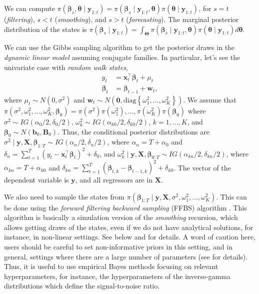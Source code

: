 We can compute $\pi(\bm{\beta}_s,\bm{\theta}\mid \bm{y}_{1:t})=\pi(\bm{\beta}_s\mid \bm{y}_{1:t},\bm{\theta})\pi(\bm{\theta}\mid \bm{y}_{1:t})$, for $s=t$ (\textit{filtering}), $s<t$ (\textit{smoothing}), and $s>t$ (\textit{forecasting}). The marginal posterior distribution of the states is $\pi(\bm{\beta}_s\mid \bm{y}_{1:t})=\int_{\bm{\Theta}}\pi(\bm{\beta}_s\mid \bm{y}_{1:t},\bm{\theta})\pi(\bm{\theta}\mid \bm{y}_{1:t})d\bm{\theta}$.

We can use the Gibbs sampling algorithm to get the posterior draws in the \textit{dynamic linear model} assuming conjugate families. In particular, let's see the univariate case with \textit{random walk states}, 
\begin{align}
	y_t&=\bm{x}_t^{\top}\bm{\beta}_t+\mu_t\label{eq1Obs}\\
	\bm{\beta}_t&=\bm{\beta}_{t-1}+\bm{w}_t \label{eq1St},
\end{align}
where $\mu_t\sim N(0,\sigma^2)$ and $\bm{w}_t\sim N(\bm{0},\text{diag}\left\{\omega_1^2,\dots,\omega_K^2\right\})$. We assume that $\pi(\sigma^2,\omega_1^2,\dots,\omega_K^2,\bm{\beta}_0)=\pi(\sigma^2)\pi(\omega_1^2),\dots,\pi(\omega_K^2)\pi(\bm{\beta}_0)$ where $\sigma^2\sim IG(\alpha_0/2,\delta_0/2)$, $\omega_k^2\sim IG(\alpha_{k0}/2,\delta_{k0}/2)$, $k=1,\dots,K$, and $\bm{\beta}_0\sim N(\bm{b}_0,\bm{B}_0)$. Thus, the conditional posterior distributions are $\sigma^2\mid \bm{y},\bm{X},\bm{\beta}_{1:T}\sim IG(\alpha_{n}/2,\delta_n/2)$, where $\alpha_{n}=T+\alpha_0$ and $\delta_n=\sum_{t=1}^T(y_t-\bm{x}_t^{\top}\bm{\beta}_t)^2+\delta_0$, and $\omega_k^2\mid \bm{y},\bm{X},\bm{\beta}_{0:T}\sim IG(\alpha_{kn}/2,\delta_{kn}/2)$, where $\alpha_{kn}=T+\alpha_{k0}$ and $\delta_{kn}=\sum_{t=1}^T(\bm{\beta}_{t,k}-\bm{\beta}_{t-1,k})^2+\delta_{k0}$. The vector of the dependent variable is $\bm{y}$, and all regressors are in $\bm{X}$.

We also need to sample the states from $\pi(\bm{\beta}_{1:T}\mid \bm{y},\bm{X},\sigma^2,\omega_1^2,\dots,\omega_K^2)$. This can be done using the \textit{forward filtering backward sampling} (FFBS) algorithm \cite{carter1994gibbs,fruhwirth1994data,shephard1994partial}. This algorithm is basically a simulation version of the \textit{smoothing} recursion, which allows getting draws of the states, even if we do not have analytical solutions, for instance, in non-linear settings. See below and \cite[Chap.~3]{petris2009dynamic} for details. A word of caution here, users should be careful to set non-informative priors in this setting, and in general, settings where there are a large number of parameters (see \cite[Chap.~8]{koop2003bayesian} for details). Thus, it is useful to use empirical Bayes methods focusing on relevant hyperparameters, for instance, the hyperparameters of the inverse-gamma distributions which define the signal-to-noise ratio.   

